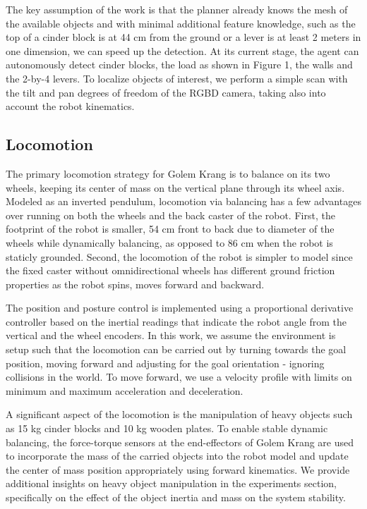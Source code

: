 \documentclass[runningheads,a4paper]{llncs}
\begin{document}
The key assumption of the work is that the planner already knows the mesh of the available objects
and with minimal additional feature knowledge, such as the top of a cinder block is at 44 cm from
the ground or a lever is at least 2 meters in one dimension, we can speed up the detection. At its
current stage, the agent can autonomously detect cinder blocks, the load as shown in Figure 1, the
walls and the 2-by-4 levers. To localize objects of interest, we perform a simple scan with the tilt
and pan degrees of freedom of the RGBD camera, taking also into account the robot kinematics.

\subsection{Locomotion}

The primary locomotion strategy for Golem Krang is to balance on its two wheels, keeping its
center of mass on the vertical plane through its wheel axis. Modeled as an inverted pendulum,
locomotion via balancing has a few advantages over running on both the wheels and the back caster of
the robot. First, the footprint of the robot is smaller, 54 cm front to back due to diameter
of the wheels while dynamically balancing, as opposed to 86 cm when the robot is staticly grounded.
Second, the locomotion of the robot is simpler to model since the fixed caster without omnidirectional
wheels has different ground friction properties as the robot spins, moves forward and backward. 

The position and posture control is implemented using a proportional derivative controller based on
the inertial readings that indicate the robot angle from the vertical and the wheel encoders. In
this work, we assume the environment is setup such that the locomotion can be carried out by
turning towards the goal position, moving forward and adjusting for the goal orientation - ignoring
collisions in the world. To move forward, we use a velocity profile with limits on minimum and maximum
acceleration and deceleration. 

A significant aspect of the locomotion is the manipulation of heavy objects such as 15 kg cinder
blocks and 10 kg wooden plates. To enable stable dynamic balancing, the force-torque sensors
at the end-effectors of Golem Krang are used to incorporate the mass of the carried objects into
the robot model and update the center of mass position appropriately using forward kinematics. We
provide additional insights on heavy object manipulation in the experiments section, specifically
on the effect of the object inertia and mass on the system stability. 
\end{document}
